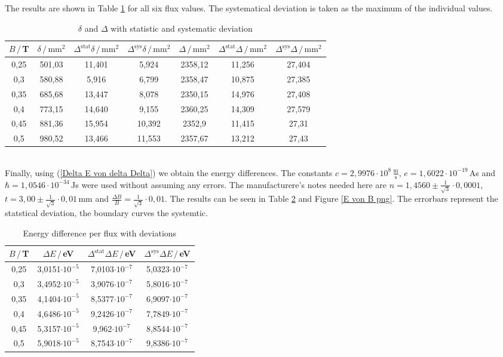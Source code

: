 \documentclass[a4paper,12pt]{article}
\newcommand{\tecxt}{}
\begin{document}
The results are shown in Table \ref{delta and Delta with statistical deviation} for all six flux values. The systematical deviation is taken as the maximum of the individual values.
\begin{table}[h!]
\centering
\begin{tabular}{c||c|c|c|c|c|c}
$B\,/\,$T&$\delta\,/\,\tecxt\text{mm}^2$&$\Delta^\tecxt\text{stat}\delta\,/\,\tecxt\text{mm}^2$&$\Delta^\tecxt\text{sys}\delta\,/\,\tecxt\text{mm}^2$&$\Delta\,/\,\tecxt\text{mm}^2$&$\Delta^\tecxt\text{stat}\Delta\,/\,\tecxt\text{mm}^2$&$\Delta^\tecxt\text{sys}\Delta\,/\,\tecxt\text{mm}^2$\\ \hline
0,25&501,03&	11,401&5,924   &2358,12&	11,256&27,404\\ \hline
0,3&580,88&	     5,916&6,799   &2358,47&	10,875&27,385\\ \hline
0,35&685,68&	13,447&8,078   &2350,15&	14,976&27,408\\ \hline
0,4&773,15&	    14,640&9,155   &2360,25&	14,309&27,579\\ \hline
0,45&881,36&	15,954&10,392  &2352,9&	    11,415&27,31\\ \hline
0,5&980,52&	    13,466&11,553  &2357,67&	13,212&27,43
\end{tabular}
\caption{$\delta$ and $\Delta$ with statistic and systematic deviation}
\label{delta and Delta with statistical deviation}
\end{table}\\
Finally, using (\ref{Delta E von delta Delta}) we obtain the energy differences. The constants $c=2,9976\cdot 10^8\,\frac{\tecxt\text{m}}{\tecxt\text{s}}$, $e = 1,6022\cdot 10^{-19}\,$As and $\hbar=1,0546\cdot 10^{-34}\,$Js were used without assuming any errors. The manufacturere's notes needed here are $n=1,4560\pm \frac{1}{\sqrt{3}}\cdot 0,0001$, $t=3,00\pm\frac{1}{\sqrt{3}}\cdot 0,01\,$mm and $\frac{\Delta B}{B}=\frac{1}{\sqrt{3}}\cdot 0,01$. The results can be seen in Table \ref{Energy difference per Flux with deviations} and Figure \ref{E von B png}. The errorbars represent the statstical deviation, the boundary curves the systemtic.
\begin{table}[h!]
\centering
\begin{tabular}{c||c|c|c}
$B\,/\,$T&$\Delta E\,/\,$eV&$\Delta^\tecxt\text{stat}\Delta E\,/\,$eV&$\Delta^\tecxt\text{sys}\Delta E\,/\,$eV\\ \hline
0,25&3,0151$\cdot 10^{-5}$&	7,0103$\cdot 10^{-7}$&	5,0323$\cdot 10^{-7}$\\ \hline
0,3&3,4952$\cdot 10^{-5}$&	3,9076$\cdot 10^{-7}$&	5,8016$\cdot 10^{-7}$\\ \hline
0,35&4,1404$\cdot 10^{-5}$&	8,5377$\cdot 10^{-7}$&	6,9097$\cdot 10^{-7}$\\ \hline
0,4&4,6486$\cdot 10^{-5}$&	9,2426$\cdot 10^{-7}$&	7,7849$\cdot 10^{-7}$\\ \hline
0,45&5,3157$\cdot 10^{-5}$&	9,962$\cdot 10^{-7}$&	8,8544$\cdot 10^{-7}$\\ \hline
0,5&5,9018$\cdot 10^{-5}$&	8,7543$\cdot 10^{-7}$&	9,8386$\cdot 10^{-7}$
\end{tabular}
\caption{Energy difference per flux with deviations}
\label{Energy difference per Flux with deviations}
\end{table}\\
\end{document}
